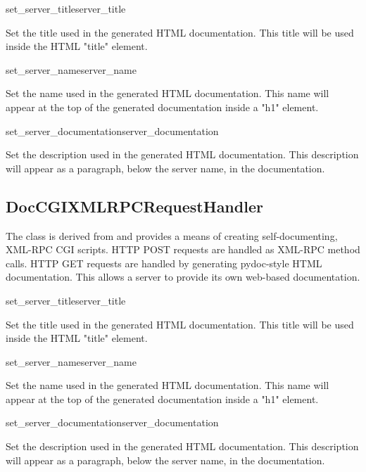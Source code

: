 \begin{methoddesc}{set_server_title}{server_title}

Set the title used in the generated HTML documentation. This title
will be used inside the HTML "title" element.

\end{methoddesc}

\begin{methoddesc}{set_server_name}{server_name}

Set the name used in the generated HTML documentation. This name will
appear at the top of the generated documentation inside a "h1"
element.

\end{methoddesc}


\begin{methoddesc}{set_server_documentation}{server_documentation}

Set the description used in the generated HTML documentation. This
description will appear as a paragraph, below the server name, in the
documentation.

\end{methoddesc}

\subsection{DocCGIXMLRPCRequestHandler}

The  class is derived from
 and provides a means
of creating self-documenting, XML-RPC CGI scripts. HTTP POST requests
are handled as XML-RPC method calls. HTTP GET requests are handled by
generating pydoc-style HTML documentation. This allows a server to
provide its own web-based documentation.

\begin{methoddesc}{set_server_title}{server_title}

Set the title used in the generated HTML documentation. This title
will be used inside the HTML "title" element.

\end{methoddesc}

\begin{methoddesc}{set_server_name}{server_name}

Set the name used in the generated HTML documentation. This name will
appear at the top of the generated documentation inside a "h1"
element.

\end{methoddesc}


\begin{methoddesc}{set_server_documentation}{server_documentation}

Set the description used in the generated HTML documentation. This
description will appear as a paragraph, below the server name, in the
documentation.

\end{methoddesc}
